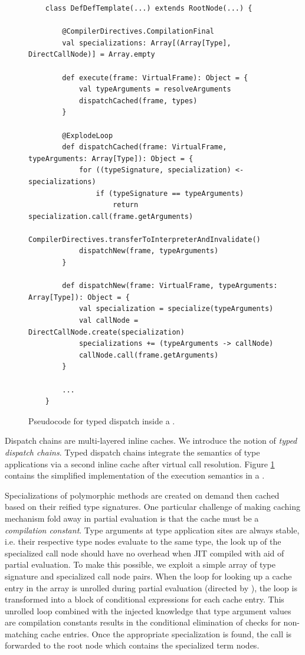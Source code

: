 \begin{figure}[!htb]
	\begin{verbatim}
	class DefDefTemplate(...) extends RootNode(...) { 
			
		@CompilerDirectives.CompilationFinal
		val specializations: Array[(Array[Type], DirectCallNode)] = Array.empty
			
		def execute(frame: VirtualFrame): Object = {
			val typeArguments = resolveArguments
			dispatchCached(frame, types)
		}
			
		@ExplodeLoop
		def dispatchCached(frame: VirtualFrame, typeArguments: Array[Type]): Object = {
			for ((typeSignature, specialization) <- specializations)
				if (typeSignature == typeArguments)
					return specialization.call(frame.getArguments)
			CompilerDirectives.transferToInterpreterAndInvalidate()
			dispatchNew(frame, typeArguments)
		}
		
		def dispatchNew(frame: VirtualFrame, typeArguments: Array[Type]): Object = {
			val specialization = specialize(typeArguments)
			val callNode = DirectCallNode.create(specialization)
			specializations += (typeArguments -> callNode)
			callNode.call(frame.getArguments)
		}
		
		...
	}
	\end{verbatim}
	\caption{Pseudocode for typed dispatch inside a .}
	\label{impl:defdeftemplate-execute}
\end{figure}

Dispatch chains\cite{trufflyruby:specialization} are multi-layered inline caches.
We introduce the notion of \textit{typed dispatch chains}.
Typed dispatch chains integrate the semantics of type applications via a second inline cache after virtual call resolution.
Figure \ref{impl:defdeftemplate-execute} contains the simplified implementation of the execution semantics in a .

Specializations of polymorphic methods are created on demand then cached based on their reified type signatures.
One particular challenge of making caching mechanism fold away in partial evaluation is that the cache must be a \textit{compilation constant}.
Type arguments at type application sites are always stable, i.e. their respective type nodes evaluate to the same type, the look up of the specialized call node should have no overhead when JIT compiled with aid of partial evaluation. 
To make this possible, we exploit a simple array of type signature and specialized call node pairs.
When the loop for looking up a cache entry in the array is unrolled during partial evaluation (directed by ), the loop is transformed into a block of conditional expressions for each cache entry.
This unrolled loop combined with the injected knowledge that type argument values are compilation constants results in the conditional elimination\cite{conditional-elim} of checks for non-matching cache entries.
Once the appropriate specialization is found, the call is forwarded to the root node which contains the specialized term nodes.

